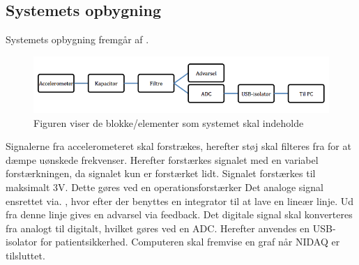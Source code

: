 


\subsection{Systemets opbygning}
Systemets opbygning fremgår af .

\begin{figure}[H]
	\centering
	\includegraphics[scale=0.62]{figures/cProblemloesning/blokdiagram1.png}
	\caption{Figuren viser de blokke/elementer som systemet skal indeholde}
	\label{kravblok}
\end{figure}

Signalerne fra accelerometeret skal forstrækes, herefter støj skal filteres fra for at dæmpe uønskede frekvenser. Herefter forstærkes signalet med en variabel forstærkningen, da signalet kun er forstærket lidt. Signalet forstærkes til maksimalt 3V. Dette gøres ved en operationsforstærker  Det analoge signal ensrettet via. , hvor efter der benyttes en integrator til at lave en lineær linje. Ud fra denne linje gives en advarsel via feedback. Det digitale signal skal konverteres fra analogt til digitalt, hvilket gøres ved en ADC.  Herefter anvendes en USB-isolator for patientsikkerhed. Computeren skal fremvise en graf når NIDAQ er tilsluttet. 

